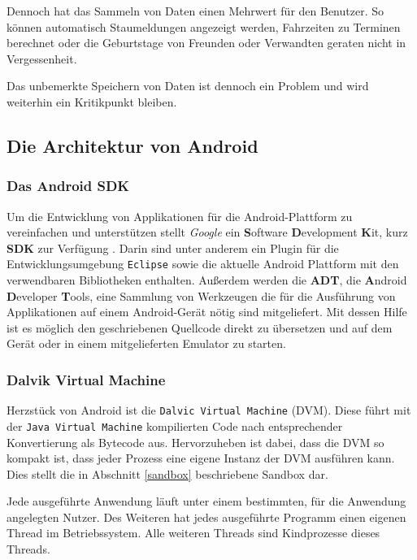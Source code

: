 Dennoch hat das Sammeln von Daten einen Mehrwert für den Benutzer. So können automatisch Staumeldungen angezeigt werden, Fahrzeiten zu Terminen berechnet oder die Geburtstage von Freunden oder Verwandten geraten nicht in Vergessenheit.

Das unbemerkte Speichern von Daten ist dennoch ein Problem und wird weiterhin ein Kritikpunkt bleiben.

\subsection{Die Architektur von Android}

\subsubsection{Das Android SDK}

Um die Entwicklung von Applikationen für die Android-Plattform zu vereinfachen und unterstützen stellt \emph{Google} ein \textbf{S}oftware \textbf{D}evelopment \textbf{K}it, kurz \textbf{SDK} zur Verfügung \cite{android_sdk}. Darin sind unter anderem ein Plugin für die Entwicklungsumgebung \verb+Eclipse+ sowie die aktuelle Android Plattform mit den verwendbaren Bibliotheken enthalten. Außerdem werden die \textbf{ADT}, die \textbf{A}ndroid \textbf{D}eveloper \textbf{T}ools, eine Sammlung von Werkzeugen die für die Ausführung von Applikationen auf einem Android-Gerät nötig sind mitgeliefert. Mit dessen Hilfe ist es möglich den geschriebenen Quellcode direkt zu übersetzen und auf dem Gerät oder in einem mitgelieferten Emulator zu starten.

\subsubsection{Dalvik Virtual Machine}

Herzstück von Android ist die \verb+Dalvic Virtual Machine+ (DVM). Diese führt mit der \verb+Java Virtual Machine+ kompilierten Code nach entsprechender Konvertierung als Bytecode aus. Hervorzuheben ist dabei, dass die DVM so kompakt ist, dass jeder Prozess eine eigene Instanz der DVM ausführen kann. Dies stellt die in Abschnitt \ref{sandbox} beschriebene Sandbox dar.

Jede ausgeführte Anwendung läuft unter einem bestimmten, für die Anwendung angelegten Nutzer. Des Weiteren hat jedes ausgeführte Programm einen eigenen Thread im Betriebssystem. Alle weiteren Threads sind Kindprozesse dieses Threads.

